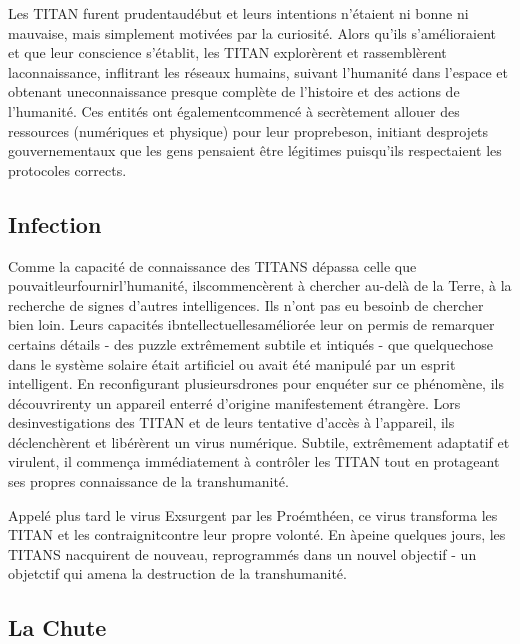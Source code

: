 Les TITAN furent prudentaudébut et  leurs intentions n'étaient ni bonne ni mauvaise, mais simplement motivées par la curiosité. Alors qu'ils s'amélioraient et que leur conscience s'établit, les TITAN explorèrent et rassemblèrent laconnaissance, inflitrant les réseaux humains, suivant l'humanité dans l'espace et obtenant uneconnaissance presque complète de l'histoire et des actions de l'humanité. Ces entités ont égalementcommencé à secrètement allouer des ressources (numériques et physique) pour leur proprebeson, initiant desprojets gouvernementaux que les gens pensaient être légitimes puisqu'ils respectaient les protocoles corrects. 

\subsection{Infection} 

Comme la capacité de connaissance des TITANS dépassa celle que pouvaitleurfournirl'humanité, ilscommencèrent à chercher au-delà de la Terre, à la recherche de signes d'autres intelligences. Ils n'ont pas eu besoinb de chercher bien loin. Leurs capacités ibntellectuellesaméliorée leur on permis de remarquer certains détails - des puzzle extrêmement subtile et intiqués - que quelquechose dans le système solaire était artificiel ou avait été manipulé par un esprit intelligent. En reconfigurant plusieursdrones pour enquéter sur ce phénomène, ils découvrirenty un appareil enterré d'origine manifestement étrangère. Lors desinvestigations des TITAN et de leurs tentative d'accès à l'appareil, ils déclenchèrent et libérèrent un virus numérique. Subtile, extrêmement adaptatif et virulent, il commença immédiatement à contrôler les TITAN tout en protageant ses propres connaissance de la transhumanité. 

Appelé plus tard le virus Exsurgent par les Proémthéen, ce virus transforma les TITAN et les contraignitcontre leur propre volonté. En àpeine quelques jours, les TITANS nacquirent de nouveau, reprogrammés dans un nouvel objectif - un objetctif qui amena la destruction de la transhumanité. 

\subsection{La Chute} 

